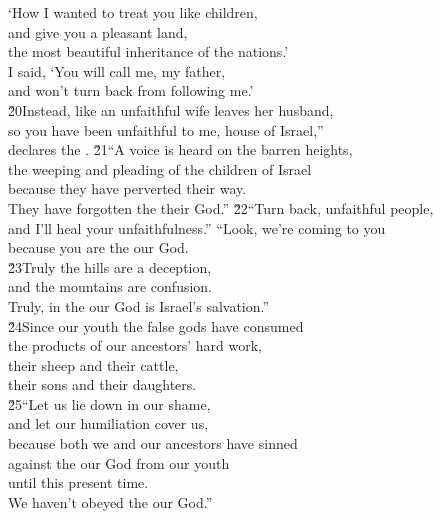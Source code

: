 \begin{poetry}
\poeml `How I wanted to treat you like children, \\
\poemll    and give you a pleasant land, \\
\poemlll       the most beautiful inheritance of the nations.' \\
\poeml I said, `You will call me, my father, \\
\poemll    and won't turn back from following me.' \\
\poeml \v{20}Instead, like an unfaithful wife leaves her husband, \\
\poemll    so you have been unfaithful to me, house of Israel,'' \\
\poemlll       declares the .
\poeml \v{21}``A voice is heard on the barren heights, \\
\poemll    the weeping and pleading of the children of Israel \\
\poeml because they have perverted their way. \\
\poemll    They have forgotten the  their God.''
\poeml \v{22}``Turn back, unfaithful people, \\
\poemll    and I'll heal your unfaithfulness.''
\poeml ``Look, we're coming to you \\
\poemll    because you are the  our God. \\
\poeml \v{23}Truly the hills are a deception, \\
\poemll    and the mountains are confusion. \\
\poemlll       Truly, in the  our God is Israel's salvation.'' \\
\poeml \v{24}Since our youth the false gods have consumed \\
\poemll    the products of our ancestors' hard work, \\
\poeml their sheep and their cattle, \\
\poemll    their sons and their daughters. \\
\poeml \v{25}``Let us lie down in our shame, \\
\poemll    and let our humiliation cover us, \\
\poeml because both we and our ancestors have sinned \\
\poemll    against the  our God from our youth \\
\poemlll       until this present time. \\
\poeml We haven't obeyed the  our God.''
\end{poetry}

